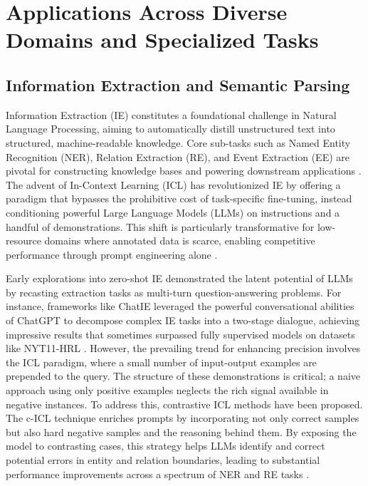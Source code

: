 \documentclass[11pt]{article}
\begin{document}
\section{Applications Across Diverse Domains and Specialized Tasks}

\subsection{Information Extraction and Semantic Parsing}

Information Extraction (IE) constitutes a foundational challenge in Natural Language Processing, aiming to automatically distill unstructured text into structured, machine-readable knowledge. Core sub-tasks such as Named Entity Recognition (NER), Relation Extraction (RE), and Event Extraction (EE) are pivotal for constructing knowledge bases and powering downstream applications \cite{ref498}. The advent of In-Context Learning (ICL) has revolutionized IE by offering a paradigm that bypasses the prohibitive cost of task-specific fine-tuning, instead conditioning powerful Large Language Models (LLMs) on instructions and a handful of demonstrations. This shift is particularly transformative for low-resource domains where annotated data is scarce, enabling competitive performance through prompt engineering alone \cite{ref499}.

Early explorations into zero-shot IE demonstrated the latent potential of LLMs by recasting extraction tasks as multi-turn question-answering problems. For instance, frameworks like ChatIE leveraged the powerful conversational abilities of ChatGPT to decompose complex IE tasks into a two-stage dialogue, achieving impressive results that sometimes surpassed fully supervised models on datasets like NYT11-HRL \cite{ref500}. However, the prevailing trend for enhancing precision involves the ICL paradigm, where a small number of input-output examples are prepended to the query. The structure of these demonstrations is critical; a naive approach using only positive examples neglects the rich signal available in negative instances. To address this, contrastive ICL methods have been proposed. The c-ICL technique enriches prompts by incorporating not only correct samples but also hard negative samples and the reasoning behind them. By exposing the model to contrasting cases, this strategy helps LLMs identify and correct potential errors in entity and relation boundaries, leading to substantial performance improvements across a spectrum of NER and RE tasks \cite{ref501}.
\end{document}
